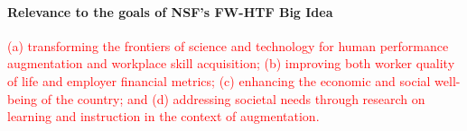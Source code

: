 

\paragraph*{Relevance to the goals of NSF's FW-HTF Big Idea}

\textcolor{red}{(a) transforming the frontiers of science and technology for human performance augmentation and workplace skill acquisition; (b) improving both worker quality of life and employer financial metrics; (c) enhancing the economic and social well-being of the country; and (d) addressing societal needs through research on learning and instruction in the context of augmentation.}


